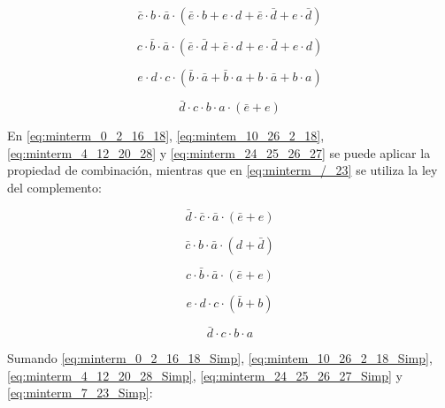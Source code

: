 \begin{equation}\label{eq:mintem_10_26_2_18}
\bar{c} \cdot b \cdot \bar{a} \cdot (\bar{e} \cdot b + e 	\cdot d + \bar{e} \cdot \bar{d} + e \cdot \bar{d})
\end{equation}

\begin{equation}\label{eq:minterm_4_12_20_28}
c \cdot \bar{b} \cdot \bar{a} \cdot (\bar{e} \cdot \bar{d} + \bar{e} \cdot d + e \cdot \bar{d} + e \cdot d)
\end{equation}

\begin{equation}\label{eq:minterm_24_25_26_27}
e \cdot d \cdot c \cdot (\bar{b} \cdot \bar{a} + \bar{b} \cdot a + b \cdot \bar{a} + b \cdot a)
\end{equation}

\begin{equation}\label{eq:minterm_7_23}
\bar{d} \cdot c \cdot b \cdot a \cdot (\bar{e} + e)
\end{equation}


En \ref{eq:minterm_0_2_16_18}, \ref{eq:mintem_10_26_2_18}, \ref{eq:minterm_4_12_20_28} y \ref{eq:minterm_24_25_26_27} se puede aplicar la propiedad de combinación, mientras que en \ref{eq:minterm_/_23} se utiliza la ley del complemento:

\begin{equation}\label{eq:minterm_0_2_16_18_Simp}
\bar{d} \cdot \bar{c} \cdot \bar{a} \cdot (\bar{e} + e)
\end{equation}

\begin{equation}\label{eq:mintem_10_26_2_18_Simp}
\bar{c} \cdot b \cdot \bar{a} \cdot (d + \bar{d})
\end{equation}

\begin{equation}\label{eq:minterm_4_12_20_28_Simp}
c \cdot \bar{b} \cdot \bar{a} \cdot (\bar{e} + e)
\end{equation}

\begin{equation}\label{eq:minterm_24_25_26_27_Simp}
e \cdot d \cdot c \cdot (\bar{b} + b)
\end{equation}

\begin{equation}\label{eq:minterm_7_23_Simp}
\bar{d} \cdot c \cdot b \cdot a 
\end{equation}

Sumando \ref{eq:minterm_0_2_16_18_Simp}, \ref{eq:mintem_10_26_2_18_Simp}, \ref{eq:minterm_4_12_20_28_Simp}, \ref{eq:minterm_24_25_26_27_Simp} y \ref{eq:minterm_7_23_Simp}:

